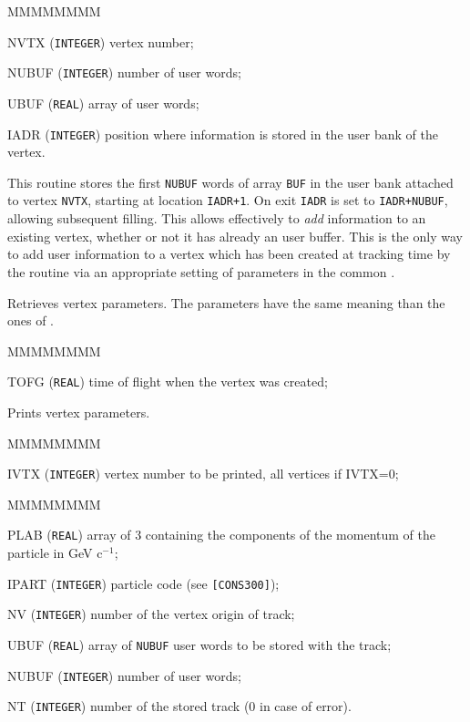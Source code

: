 \begin{DLtt}{MMMMMMMM}
\item[NVTX] ({\tt INTEGER}) vertex number;
\item[NUBUF] ({\tt INTEGER}) number of user words;
\item[UBUF] ({\tt REAL}) array of user words;
\item[IADR] ({\tt INTEGER}) position where information is stored in the
user bank of the vertex.
\end{DLtt}

This routine stores the first {\tt NUBUF} words of array {\tt BUF} in the
user bank attached to vertex {\tt NVTX}, starting at location {\tt IADR+1}.
On exit {\tt IADR} is set to {\tt IADR+NUBUF}, allowing subsequent filling. 
This allows effectively 
to {\it add} information to an existing vertex, whether or not it has already
an user buffer. This is the only way to add user information to a vertex
which has been created at tracking time by the routine  via
an appropriate setting of parameters in the common .

Retrieves vertex parameters. The parameters have the same meaning
than the ones of .
\begin{DLtt}{MMMMMMMM}
\item[TOFG] ({\tt REAL}) time of flight when the vertex was created;
\end{DLtt}

 
Prints vertex parameters.
\begin{DLtt}{MMMMMMMM}
\item[IVTX] ({\tt INTEGER}) vertex number to be printed, all vertices if IVTX=0;
\end{DLtt}

 
\begin{DLtt}{MMMMMMMM}
\item[PLAB] ({\tt REAL}) array of 3 containing the components of
the momentum of the particle in GeV c$^{-1}$;
\item[IPART] ({\tt INTEGER}) particle code (see {\tt [CONS300]});
\item[NV] ({\tt INTEGER}) number of the vertex origin of track;
\item[UBUF] ({\tt REAL}) array of {\tt NUBUF} user words
to be stored with the track;
\item[NUBUF] ({\tt INTEGER}) number of user words;
\item[NT] ({\tt INTEGER}) number of the stored track (0 in case of error).
\end{DLtt}

